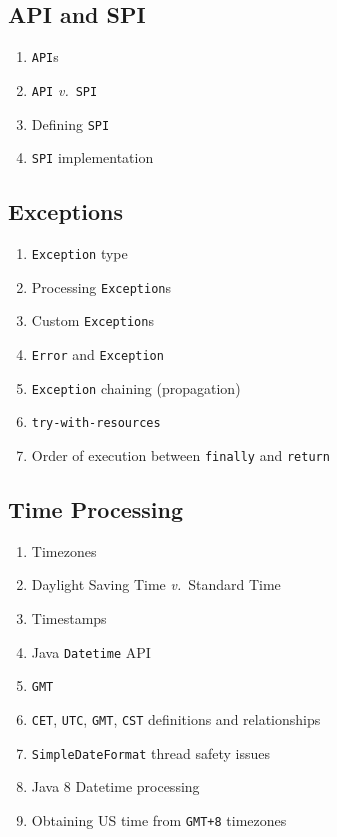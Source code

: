 \documentclass[11pt, twocolumn]{article}
\newcommand{\versus}{\textit{v.}\ }
\begin{document}
\subsection{API and SPI}
\begin{enumerate}
	\item \texttt{API}s
	\item \texttt{API} \versus \texttt{SPI}
	\item Defining \texttt{SPI}
	\item \texttt{SPI} implementation
\end{enumerate}

\subsection{Exceptions}
\begin{enumerate}
	\item \texttt{Exception} type
	\item Processing \texttt{Exception}s
	\item Custom \texttt{Exception}s
	\item \texttt{Error} and \texttt{Exception}
	\item \texttt{Exception} chaining (propagation)
	\item \texttt{try-with-resources}
	\item Order of execution between \texttt{finally} and \texttt{return}
\end{enumerate}

\subsection{Time Processing}
\begin{enumerate}
	\item Timezones
	\item Daylight Saving Time \versus Standard Time
	\item Timestamps
	\item Java \texttt{Datetime} API
	\item \texttt{GMT}
	\item \texttt{CET}, \texttt{UTC}, \texttt{GMT}, \texttt{CST} definitions and relationships
	\item \texttt{SimpleDateFormat} thread safety issues
	\item Java 8 Datetime processing
	\item Obtaining US time from \texttt{GMT+8} timezones
\end{enumerate}
\end{document}
